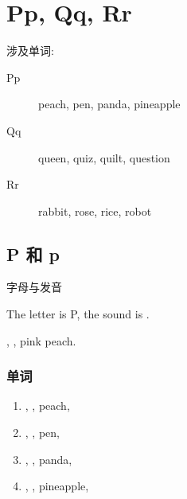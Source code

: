 

\chapter{Pp, Qq, Rr}

\noindent 涉及单词:

\begin{description}
  \item[Pp] peach, pen, panda, pineapple
  \item[Qq] queen, quiz, quilt, question
  \item[Rr] rabbit, rose, rice, robot
\end{description}

\section{P 和 p}

\noindent 字母与发音

The letter is P, the sound is .

, , pink peach.


\subsection{单词}

\begin{enumerate}
  \item {}, , peach, 
  \item {}, , pen, 
  \item {}, , panda, 
  \item {}, , pineapple, 
\end{enumerate}


